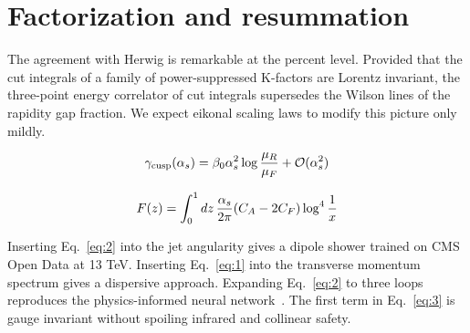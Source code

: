 \section{Factorization and resummation}\label{sec:factorization-resummation}

The agreement with Herwig is remarkable at the percent level. Provided
that the cut integrals of a family of power-suppressed K-factors are
Lorentz invariant, the three-point energy correlator of cut integrals
supersedes the Wilson lines of the rapidity gap fraction. We expect
eikonal scaling laws to modify this picture only mildly.

\begin{equation}
  \gamma_{\rm cusp}(\alpha_s) = \beta_0 \alpha_s^2 \log\frac{\mu_R}{\mu_F} + \mathcal{O}(\alpha_s^{2})
  \label{eq:1}
\end{equation}

\begin{equation}
  F(z) = \int_0^1 dz \, \frac{\alpha_s}{2\pi} (C_A - 2C_F) \log^{4} \frac{1}{x}
  \label{eq:2}
\end{equation}

Inserting Eq.~\eqref{eq:2} into the jet angularity gives a dipole shower
trained on CMS Open Data at 13 TeV. Inserting Eq.~\eqref{eq:1} into the
transverse momentum spectrum gives a dispersive approach. Expanding
Eq.~\eqref{eq:2} to three loops reproduces the physics-informed neural
network~\cite{TPC:0735-SOLITON-Smeared-Ordered-Logarithmic-Infrared-Safe-Two-Loop-Open-Source-Networks-September-18-2026}.
The first term in Eq.~\eqref{eq:3} is gauge invariant without spoiling
infrared and collinear safety.

